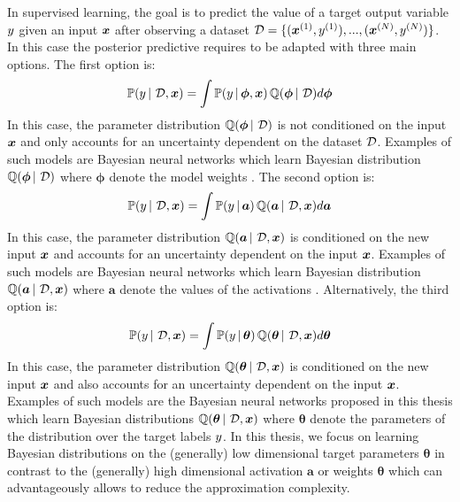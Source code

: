 In supervised learning, the goal is to predict the value of a target output variable $y$ given an input $\bm{x}$ after observing a dataset $\operatorname{\mathcal{D}}=\{(\bm{x}^{(1)}, y^{(1)}), ..., (\bm{x}^{(N)}, y^{(N)})\}$.
In this case the posterior predictive requires to be adapted with three main options. The first option is:
\begin{equation}
    \mathbb{P}(y \,|\, \operatorname{\mathcal{D}}, \bm{x}) = \int \mathbb{P}(y \,|\, \bm{\phi}, \bm{x}) \operatorname{\mathbb{Q}}(\bm{\phi} \,|\, \operatorname{\mathcal{D}}) d\bm{\phi}
\end{equation}
In this case, the parameter distribution $\operatorname{\mathbb{Q}}(\bm{\phi} \,|\, \operatorname{\mathcal{D}})$ is not conditioned on the input $\bm{x}$ and only accounts for an uncertainty dependent on the dataset $\operatorname{\mathcal{D}}$. Examples of such models are Bayesian neural networks which learn Bayesian distribution $\operatorname{\mathbb{Q}}(\bm{\phi} \,|\, \operatorname{\mathcal{D}})$ where $\bm{\phi}$ denote the model weights \cite{bayesian-networks}.
The second option is:
\begin{equation}
    \mathbb{P}(y \,|\, \operatorname{\mathcal{D}}, \bm{x}) = \int \mathbb{P}(y \,|\, \bm{a}) \operatorname{\mathbb{Q}}(\bm{a} \,|\, \operatorname{\mathcal{D}}, \bm{x}) d\bm{a}
\end{equation}
In this case, the parameter distribution $\operatorname{\mathbb{Q}}(\bm{a} \,|\, \operatorname{\mathcal{D}}, \bm{x})$ is conditioned on the new input $\bm{x}$ and accounts for an uncertainty dependent on the input $\bm{x}$. Examples of such models are Bayesian neural networks which learn Bayesian distribution $\operatorname{\mathbb{Q}}(\bm{a} \,|\, \operatorname{\mathcal{D}}, \bm{x})$ where $\bm{a}$ denote the values of the activations \cite{gp-uncertainty-activation,natural-parameter-network}.
Alternatively, the third option is:
\begin{equation}
    \mathbb{P}(y \,|\, \operatorname{\mathcal{D}}, \bm{x}) = \int \mathbb{P}(y \,|\, \bm{\theta}) \operatorname{\mathbb{Q}}(\bm{\theta} \,|\, \operatorname{\mathcal{D}}, \bm{x}) d\bm{\theta}
\end{equation}
In this case, the parameter distribution $\operatorname{\mathbb{Q}}(\bm{\theta} \,|\, \operatorname{\mathcal{D}}, \bm{x})$ is conditioned on the new input $\bm{x}$ and also accounts for an uncertainty dependent on the input $\bm{x}$. Examples of such models are the Bayesian neural networks proposed in this thesis \cite{charpentier2020,natpn, graph-postnet,charpentier2022uncertainty-rl,uceloss} which learn Bayesian distributions $\operatorname{\mathbb{Q}}(\bm{\theta} \,|\, \operatorname{\mathcal{D}}, \bm{x})$ where $\bm{\theta}$ denote the parameters of the distribution over the target labels $y$. In this thesis, we focus on learning  Bayesian distributions on the (generally) low dimensional target parameters $\bm{\theta}$ in contrast to the (generally) high dimensional activation $\bm{a}$ or weights  $\bm{\theta}$ which can advantageously allows to reduce the approximation complexity.


